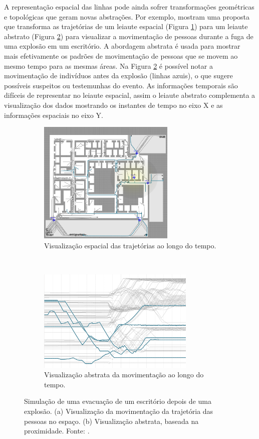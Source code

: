 A representação espacial das linhas pode ainda sofrer transformações
geométricas e topológicas que geram novas abstrações. Por exemplo,
\citet{Tarik2009} mostram uma proposta que transforma as trajetórias de um
leiaute espacial (Figura \ref{fig:viz-espacial}) para um leiaute abstrato
(Figura \ref{fig:viz-abstrata}) para visualizar a movimentação de pessoas
durante a fuga de uma explosão em um escritório. A abordagem abstrata é usada
para mostrar mais efetivamente os padrões de movimentação de pessoas que se
movem ao mesmo tempo para as mesmas áreas. Na Figura \ref{fig:viz-abstrata} é
possível notar a movimentação de indivíduos antes da explosão (linhas azuis), o
que sugere possíveis suspeitos ou testemunhas do evento.  As informações
temporais são difíceis de representar no leiaute espacial, assim o leiaute
abstrato complementa a visualização dos dados mostrando os instantes de tempo
no eixo X e as informações espaciais no eixo Y.

\begin{figure}[ht!]
  \centering
  \begin{subfigure}[t]{0.45\textwidth}
    \centering
    \includegraphics[width=65mm]{../figuras/proximidade-espacial.png}
    \caption{Visualização espacial das trajetórias ao longo do tempo. \label{fig:viz-espacial}}
  \end{subfigure}
  ~
  \begin{subfigure}[t]{0.45\textwidth}
    \centering
    \includegraphics[width=75mm]{../figuras/proximidade-abstrata.png}
    \caption{Visualização abstrata da movimentação ao longo do tempo. \label{fig:viz-abstrata}}
  \end{subfigure}

  \caption[Visualização espacial vs abstrata da movimentação de pessoas]{Simulação de uma evacuação de um escritório depois de uma explosão.
(a) Visualização da movimentação da trajetória das pessoas no espaço. (b)
Visualização abstrata, baseada na proximidade.  Fonte: \citet{Tarik2009}.
\label{fig:tarik}}
\end{figure}

